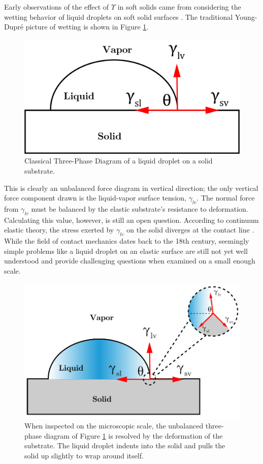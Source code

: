 Early observations of the effect of $ \Upsilon $ in soft solids came from considering the wetting behavior of liquid droplets on soft solid surfaces \cite{xu2017direct,jerison2011deformation,style2013universal,xu2018surface}. The traditional Young-Dupr\'{e} picture of wetting is shown in Figure \ref{fig:three-phase}.
\begin{figure}[h!]
	\centering
	\includegraphics[width=.6\textwidth]{Chapters/Figures/phase_diagram.PNG}
	\caption[Three-Phase Diagram]{Classical Three-Phase Diagram of a liquid droplet on a solid substrate.}
	\label{fig:three-phase} 
\end{figure}
This is clearly an unbalanced force diagram in vertical direction; the only vertical force component drawn is the liquid-vapor surface tension, $ \gamma_{lv} $. The normal force from $\gamma_{lv}$ must be balanced by the elastic substrate's resistance to deformation. Calculating this value, however, is still an open question. According to continuum elastic theory, the stress exerted by $\gamma_{lv}$ on the solid diverges at the contact line \cite{jerison2011deformation}. While the field of contact mechanics dates back to the 18th century, seemingly simple problems like a liquid droplet on an elastic surface are still not yet well understood and provide challenging questions when examined on a small enough scale. 

\begin{figure}[h!]
	\centering
	\includegraphics[width=.6\textwidth]{Chapters/Figures/phase_diagram}
	\caption[Three-Phase Diagram: Zoomed]{When inspected on the microscopic scale, the unbalanced three-phase diagram of Figure \ref{fig:three-phase} is resolved by the deformation of the substrate. The liquid droplet indents into the solid and pulls the solid up slightly to wrap around itself.}
	\label{fig:three-phase-zoomed} 
\end{figure}


